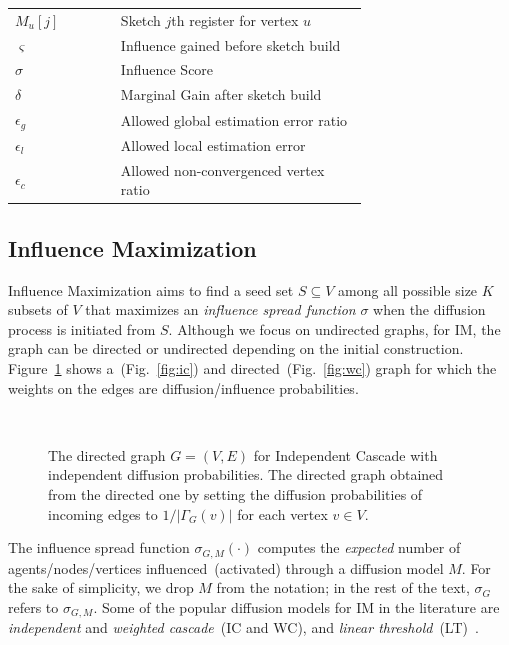 \documentclass[10pt,journal,compsoc]{IEEEtran}
\begin{document}
\begin{table}[!ht]
\begin{tabular}{|l|p{0.7\linewidth}|}
        $M_u[j]$        & Sketch $j$th register for vertex $u$\\
        $\varsigma $    & Influence gained before sketch build\\
        $\sigma $       & Influence Score\\
        $\delta$        & Marginal Gain after sketch build\\
        $\epsilon_g$    & Allowed global estimation error ratio\\
        $\epsilon_l$    & Allowed local estimation error\\ 
        $\epsilon_c$    & Allowed non-convergenced vertex ratio\\
        \hline         
    \end{tabular}
\end{table}
\subsection{Influence Maximization}

Influence Maximization aims to find a seed set $S \subseteq V$ among all possible size $K$ subsets of $V$ that maximizes an {\em influence spread function} $\sigma$  when the diffusion process is initiated from $S$. Although we focus on undirected graphs, for IM, the graph can be directed or undirected depending on the initial construction. Figure~\ref{fig:xx} shows a~(Fig.~\ref{fig:ic}) and directed~(Fig.~\ref{fig:wc})
graph for which the weights on the edges are diffusion/influence probabilities. 

\begin{figure}[!ht] 
    \centering
    \\%
  \caption{\protect{} 
The directed graph $G = (V, E)$ for Independent Cascade with independent diffusion probabilities. 
\protect{}
The directed graph obtained from the directed one by setting the diffusion probabilities of incoming edges to $1 / |\Gamma_G(v)|$ for each vertex $v \in V$. 
  }
  \label{fig:xx} 
\end{figure}
The influence spread function $\sigma_{G,M}(\cdot)$ computes the {\em expected} number of agents/nodes/vertices influenced~(activated) through a diffusion model $M$. For the sake of simplicity, we drop $M$ from the notation; in the rest of the text, $\sigma_{G}$ refers to $\sigma_{G,M}$. Some of the popular diffusion models for IM in the literature are {\em independent} and {\em weighted cascade}~(IC and WC),  and {\em linear threshold}~(LT)~\cite{kempe2003maximizing}. 
\end{document}
